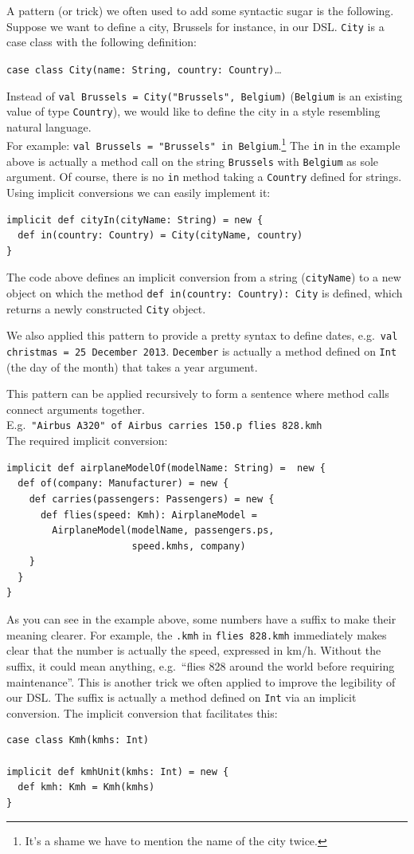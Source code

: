 \documentclass[a4paper]{article}
\newcommand{\cc}[1]{\texttt{#1}}
\renewcommand{\sc}[1]{\lstinline{#1}}
\begin{document}
A pattern (or trick) we often used to add some syntactic sugar is the following.
Suppose we want to define a city, Brussels for instance, in our DSL\@.
\cc{City} is a case class with the following definition:

\sc{case class City(name: String, country: Country)}\ldots{}

Instead of \sc{val Brussels = City("Brussels", Belgium)} (\cc{Belgium} is an existing value of type \cc{Country}), we would like to define the city in a style resembling natural language.\\
For example: \sc{val Brussels = "Brussels" in Belgium}.\footnote{It's a shame we have to mention the name of the city twice.}
The \sc{in} in the example above is actually a method call on the string \cc{Brussels} with \cc{Belgium} as sole argument.
Of course, there is no \sc{in} method taking a \cc{Country} defined for strings.
Using implicit conversions we can easily implement it:

\begin{lstlisting}
implicit def cityIn(cityName: String) = new {
  def in(country: Country) = City(cityName, country)
}
\end{lstlisting}

The code above defines an implicit conversion from a string (\sc{cityName}) to a new object on which the method \sc{def in(country: Country): City} is defined, which returns a newly constructed \cc{City} object.

We also applied this pattern to provide a pretty syntax to define dates, e.g.\ \sc{val christmas = 25 December 2013}.
\cc{December} is actually a method defined on \cc{Int} (the day of the month) that takes a year argument.

This pattern can be applied recursively to form a sentence where method calls connect arguments together.\\
E.g.\ \sc{"Airbus A320" of Airbus carries 150.p flies 828.kmh}\\
The required implicit conversion:

\begin{lstlisting}
implicit def airplaneModelOf(modelName: String) =  new {
  def of(company: Manufacturer) = new {
    def carries(passengers: Passengers) = new {
      def flies(speed: Kmh): AirplaneModel =
        AirplaneModel(modelName, passengers.ps,
                      speed.kmhs, company)
    }
  }
}
\end{lstlisting}

As you can see in the example above, some numbers have a suffix to make their meaning clearer.
For example, the \sc{.kmh} in \sc{flies 828.kmh} immediately makes clear that the number is actually the speed, expressed in km/h.
Without the suffix, it could mean anything, e.g.\ ``flies 828 around the world before requiring maintenance''.
This is another trick we often applied to improve the legibility of our DSL.
The suffix is actually a method defined on \cc{Int} via an implicit conversion.
The implicit conversion that facilitates this:
\begin{lstlisting}
case class Kmh(kmhs: Int)

implicit def kmhUnit(kmhs: Int) = new {
  def kmh: Kmh = Kmh(kmhs)
}
\end{lstlisting}
\end{document}

